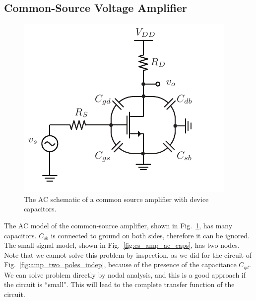 \subsection{Common-Source Voltage Amplifier}
\begin{figure}[tb]
\centering
\includegraphics[scale=1]{cs_amp_caps}
\caption{The AC schematic of a common source amplifier with device capacitors.} \label{fig:cs_amp_caps}
\end{figure}
The AC model of the common-source amplifier, shown in Fig.~\ref{fig:cs_amp_caps}, has many capacitors.  
 $C_{sb}$ is connected to ground on both sides, therefore it can be ignored.  The small-signal model, shown in Fig.~\ref{fig:cs_amp_ac_caps}, has two nodes.  Note that we cannot solve this problem by inspection, as we did for the circuit of Fig.~\ref{fig:amp_two_poles_indep}, because of the presence of the capacitance $C_{gd}$. We can solve problem directly by nodal analysis, and this is a good approach if the circuit is ``small".  This will lead to the complete transfer function of the circuit.
